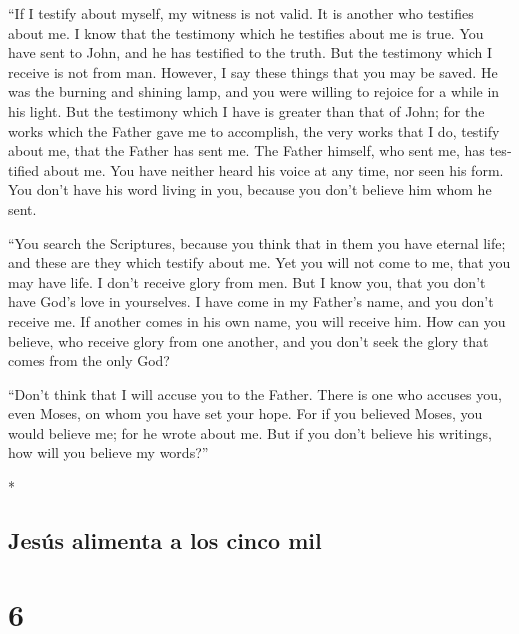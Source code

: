 \begin{paracol}{2}
\begin{otherlanguage}{english}
 ``If I testify about myself, my witness is not valid.
 It is another who testifies about me. I know that the
testimony which he testifies about me is true.  You have
sent to John, and he has testified to the truth.  But the
testimony which I receive is not from man. However, I say these things
that you may be saved.  He was the burning and shining
lamp, and you were willing to rejoice for a while in his light.
 But the testimony which I have is greater than that of
John; for the works which the Father gave me to accomplish, the very
works that I do, testify about me, that the Father has sent me.
 The Father himself, who sent me, has testified about me.
You have neither heard his voice at any time, nor seen his form.
 You don't have his word living in you, because you don't
believe him whom he sent.

 ``You search the Scriptures, because you think that in
them you have eternal life; and these are they which testify about me.
 Yet you will not come to me, that you may have life.
 I don't receive glory from men.  But I
know you, that you don't have God's love in yourselves. 
I have come in my Father's name, and you don't receive me. If another
comes in his own name, you will receive him.  How can you
believe, who receive glory from one another, and you don't seek the
glory that comes from the only God?

 ``Don't think that I will accuse you to the Father.
There is one who accuses you, even Moses, on whom you have set your
hope.  For if you believed Moses, you would believe me;
for he wrote about me.  But if you don't believe his
writings, how will you believe my words?''

\end{otherlanguage}

\switchcolumn[0]*

\hypertarget{jesuxfas-alimenta-a-los-cinco-mil}{%
\subsection{Jesús alimenta a los cinco
mil}\label{jesuxfas-alimenta-a-los-cinco-mil}}

\hypertarget{section-10}{%
\section{6}\label{section-10}}


\end{paracol}
